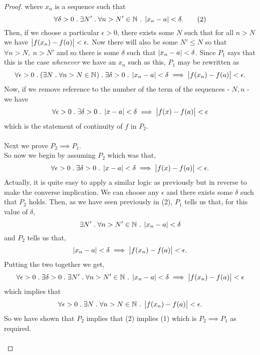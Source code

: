 \documentclass[MathsNotesBase.tex]{subfiles}
\begin{document}
{\begin{proof}
			where $x_n$ is a sequence such that
			\[ \forall \delta > 0 \;.\; \exists N' \;.\; \forall n > N' \in \mathbb{N}^{} \;.\; \left\lvert x_n - a\right\rvert < \delta. \tag{2} \]
			Then, if we choose a particular ${ \epsilon > 0 }$, there exists some $N$ such that for all ${ n > N }$ we have ${ \left\lvert f(x_n) - f(a)\right\rvert < \epsilon. }$ Now there will also be some $N' \leq N$ so that ${ \forall n > N, \; n > N' }$ and so there is some $\delta$ such that ${ \left\lvert x_n - a\right\rvert < \delta }$. Since $P_1$ says that this is the case \textit{whenever} we have an $x_n$ such as this, $P_1$ may be rewritten as
			\[ \forall \epsilon > 0 \;.\; (\exists N \;.\; \forall n > N \in \mathbb{N}^{}) \;.\; \exists \delta > 0 \;.\; \left\lvert x_n - a\right\rvert < \delta \implies \left\lvert f(x_n) - f(a)\right\rvert < \epsilon. \]
			Now, if we remove reference to the number of the term of the sequences - ${ N,n }$ - we have
			\[ \forall \epsilon > 0 \;.\; \exists \delta > 0 \;.\; \left\lvert x - a\right\rvert < \delta \implies \left\lvert f(x) - f(a)\right\rvert < \epsilon \]
			which is the statement of continuity of $f$ in $P_2$.
			\\\\
			Next we prove ${ P_2 \implies P_1. }$\\
			So now we begin by assuming $P_2$ which was that,
			\[ \forall \epsilon > 0 \;.\; \exists \delta > 0 \;.\; \left\lvert x - a\right\rvert < \delta \implies \left\lvert f(x) - f(a)\right\rvert < \epsilon. \]
			Actually, it is quite easy to apply a similar logic as previously but in reverse to make the converse implication. We can choose any $\epsilon$ and there exists some $\delta$ such that $P_2$ holds. Then, as we have seen previously in (2), $P_1$ tells us that, for this value of $\delta$,
			\[ \exists N' \;.\; \forall n > N' \in \mathbb{N}^{} \;.\; \left\lvert x_n - a\right\rvert < \delta \]
			and $P_2$ tells us that,
			\[ \left\lvert x_n - a\right\rvert < \delta \implies \left\lvert f(x_n) - f(a)\right\rvert < \epsilon. \]
			Putting the two together we get,
			\[ \forall \epsilon > 0 \;.\; \exists \delta > 0 \;.\; \exists N' \;.\; \forall n > N' \in \mathbb{N}^{} \;.\; \left\lvert x_n - a\right\rvert < \delta \implies \left\lvert f(x_n) - f(a)\right\rvert < \epsilon \]
			which implies that
			\[ \forall \epsilon > 0 \;.\; \exists N \;.\; \forall n > N \in \mathbb{N}^{} \;.\; \left\lvert f(x_n) - f(a)\right\rvert < \epsilon. \]
			So we have shown that $P_2$ implies that (2) implies (1) which is ${ P_2 \implies P_1 }$ as required.\\\\
			

\end{proof}}
\end{document}
